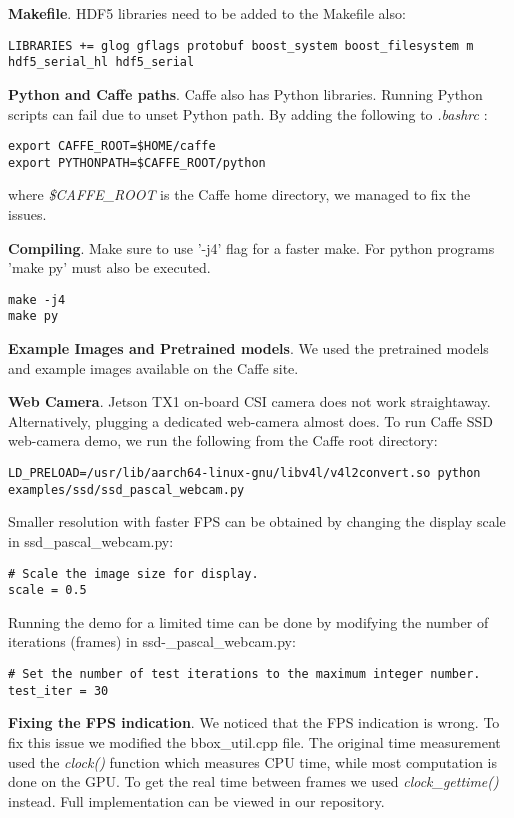 \textbf{Makefile}.
HDF5 libraries need to be added to the Makefile also:
\begin{lstlisting} 
LIBRARIES += glog gflags protobuf boost_system boost_filesystem m hdf5_serial_hl hdf5_serial
\end{lstlisting}

\textbf{Python and Caffe paths}.
Caffe also has Python libraries. Running Python scripts can fail due to unset Python path. By adding the following to \textit{.bashrc} :
\begin{lstlisting} 
export CAFFE_ROOT=$HOME/caffe
export PYTHONPATH=$CAFFE_ROOT/python
\end{lstlisting}
where \textit{\$CAFFE\_ROOT} is the Caffe home directory, we managed to fix the issues. 

\textbf{Compiling}.
Make sure to use '-j4' flag for a faster make. For python programs 'make py' must also be executed.
\begin{lstlisting} 
make -j4
make py
\end{lstlisting}

\textbf{Example Images and Pretrained models}.
We used the pretrained models and example images available on the Caffe site.

\textbf{Web Camera}.
Jetson TX1 on-board CSI camera does not work straightaway. Alternatively, plugging a dedicated web-camera almost does. To run Caffe SSD web-camera demo, we run the following from the Caffe root directory:
\begin{lstlisting} 
LD_PRELOAD=/usr/lib/aarch64-linux-gnu/libv4l/v4l2convert.so python examples/ssd/ssd_pascal_webcam.py
\end{lstlisting}

Smaller resolution with faster FPS can be obtained by changing the display scale 
in ssd\_pascal\_webcam.py:
\begin{lstlisting} 
# Scale the image size for display.
scale = 0.5
\end{lstlisting}

Running the demo for a limited time can be done by modifying the number of iterations (frames) in ssd-\_pascal\_webcam.py:
\begin{lstlisting} 
# Set the number of test iterations to the maximum integer number.
test_iter = 30 
\end{lstlisting}

\textbf{Fixing the FPS indication}. We noticed that the FPS indication is wrong. To fix this issue we modified the bbox\_util.cpp file. The original time measurement used the \textit{clock()} function which measures CPU time, while most computation is done on the GPU. To get the real time between frames we used \textit{clock\_gettime()} instead. Full implementation can be viewed in our repository.

